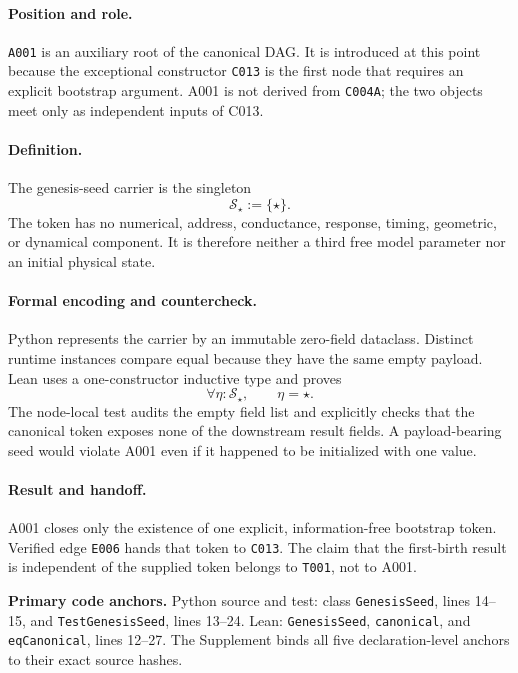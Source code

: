
\paragraph*{Position and role.}
\texttt{A001} is an auxiliary root of the canonical DAG.  It is introduced at
this point because the exceptional constructor \texttt{C013} is the first node
that requires an explicit bootstrap argument.  A001 is not derived from
\texttt{C004A}; the two objects meet only as independent inputs of C013.

\paragraph*{Definition.}
The genesis-seed carrier is the singleton
\begin{equation}
  \mathcal S_\star:=\{\star\}.
  \label{eq:a001-singleton-seed}
\end{equation}
The token has no numerical, address, conductance, response, timing, geometric,
or dynamical component.  It is therefore neither a third free model parameter
nor an initial physical state.

\paragraph*{Formal encoding and countercheck.}
Python represents the carrier by an immutable zero-field dataclass.  Distinct
runtime instances compare equal because they have the same empty payload.  Lean
uses a one-constructor inductive type and proves
\begin{equation}
  \forall\eta:\mathcal S_\star,\qquad \eta=\star.
\end{equation}
The node-local test audits the empty field list and explicitly checks that the
canonical token exposes none of the downstream result fields.  A payload-bearing
seed would violate A001 even if it happened to be initialized with one value.

\paragraph*{Result and handoff.}
A001 closes only the existence of one explicit, information-free bootstrap
token.  Verified edge \texttt{E006} hands that token to \texttt{C013}.  The
claim that the first-birth result is independent of the supplied token belongs
to \texttt{T001}, not to A001.

\noindent\textbf{Primary code anchors.}
Python source and test: class \texttt{GenesisSeed}, lines 14--15, and
\texttt{TestGenesisSeed}, lines 13--24.  Lean: \texttt{GenesisSeed},
\texttt{canonical}, and \texttt{eqCanonical}, lines 12--27.  The Supplement
binds all five declaration-level anchors to their exact source hashes.
